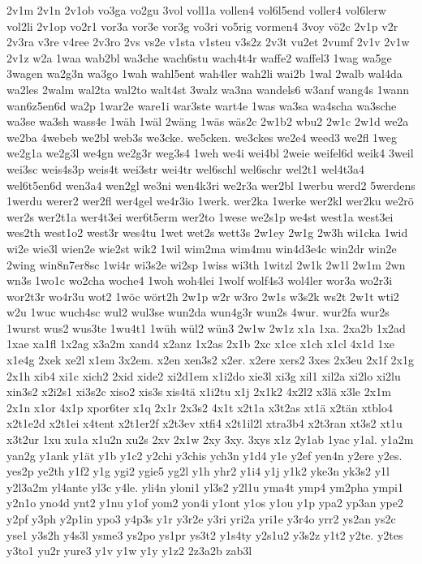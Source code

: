 {2v1m
2v1n
2v1ob
vo3ga
vo2gu
3vol
voll1a
vollen4
vol6l5end
voller4
vol6lerw
vol2li
2v1op
vo2r1
vor3a
vor3e
vor3g
vo3ri
vo5rig
vormen4
3voy
vö2c
2v1p
v2r
2v3ra
v3re
v4ree
2v3ro
2vs
vs2e
v1sta
v1steu
v3s2z
2v3t
vu2et
2vumf
2v1v
2v1w
2v1z
w2a
1waa
wab2bl
wa3che
wach6stu
wach4t4r
waffe2
waffel3
1wag
wa5ge
3wagen
wa2g3n
wa3go
1wah
wahl5ent
wah4ler
wah2li
wai2b
1wal
2walb
wal4da
wa2les
2walm
wal2ta
wal2to
walt4st
3walz
wa3na
wandels6
w3anf
wang4s
1wann
wan6z5en6d
wa2p
1war2e
ware1i
war3ste
wart4e
1was
wa3sa
wa4scha
wa3sche
wa3se
wa3sh
wass4e
1wäh
1wäl
2wäng
1wäs
wäs2c
2w1b2
wbu2
2w1c
2w1d
we2a
we2ba
4webeb
we2bl
web3s
we3cke.
we5cken.
we3ckes
we2e4
weed3
we2fl
1weg
we2g1a
we2g3l
we4gn
we2g3r
weg3s4
1weh
we4i
wei4bl
2weie
weifel6d
weik4
3weil
wei3sc
weis4s3p
weis4t
wei3str
wei4tr
wel6schl
wel6schr
wel2t1
wel4t3a4
wel6t5en6d
wen3a4
wen2gl
we3ni
wen4k3ri
we2r3a
wer2bl
1werbu
werd2
5werdens
1werdu
werer2
wer2fl
wer4gel
we4r3io
1werk.
wer2ka
1werke
wer2kl
wer2ku
we2rö
wer2s
wer2t1a
wer4t3ei
wer6t5erm
wer2to
1wese
we2s1p
we4st
west1a
west3ei
wes2th
west1o2
west3r
wes4tu
1wet
wet2s
wett3s
2w1ey
2w1g
2w3h
wi1cka
1wid
wi2e
wie3l
wien2e
wie2st
wik2
1wil
wim2ma
wim4mu
win4d3e4c
win2dr
win2e
2wing
win8n7er8sc
1wi4r
wi3s2e
wi2sp
1wiss
wi3th
1witzl
2w1k
2w1l
2w1m
2wn
wn3s
1wo1c
wo2cha
woche4
1woh
woh4lei
1wolf
wolf4s3
wol4ler
wor3a
wo2r3i
wor2t3r
wo4r3u
wot2
1wöc
wört2h
2w1p
w2r
w3ro
2w1s
w3s2k
ws2t
2w1t
wti2
w2u
1wuc
wuch4sc
wul2
wul3se
wun2da
wun4g3r
wun2s
4wur.
wur2fa
wur2s
1wurst
wus2
wus3te
1wu4t1
1wüh
wül2
wün3
2w1w
2w1z
x1a
1xa.
2xa2b
1x2ad
1xae
xa1fl
1x2ag
x3a2m
xand4
x2anz
1x2as
2x1b
2xc
x1ce
x1ch
x1cl
4x1d
1xe
x1e4g
2xek
xe2l
x1em
3x2em.
x2en
xen3s2
x2er.
x2ere
xers2
3xes
2x3eu
2x1f
2x1g
2x1h
xib4
xi1c
xich2
2xid
xide2
xi2d1em
x1i2do
xie3l
xi3g
xil1
xil2a
xi2lo
xi2lu
xin3s2
x2i2s1
xi3s2c
xiso2
xis3s
xis4tä
x1i2tu
x1j
2x1k2
4x2l2
x3lä
x3le
2x1m
2x1n
x1or
4x1p
xpor6ter
x1q
2x1r
2x3s2
4x1t
x2t1a
x3t2as
xt1ä
x2tän
xtblo4
x2t1e2d
x2t1ei
x4tent
x2t1er2f
x2t3ev
xtfi4
x2t1il2l
xtra3b4
x2t3ran
xt3s2
xt1u
x3t2ur
1xu
xu1a
x1u2n
xu2s
2xv
2x1w
2xy
3xy.
3xys
x1z
2y1ab
1yac
y1al.
y1a2m
yan2g
y1ank
y1ät
y1b
y1c2
y2chi
y3chis
ych3n
y1d4
y1e
y2ef
yen4n
y2ere
y2es.
yes2p
ye2th
y1f2
y1g
ygi2
ygie5
yg2l
y1h
yhr2
y1i4
y1j
y1k2
yke3n
yk3s2
y1l
y2l3a2m
yl4ante
yl3c
y4le.
yli4n
yloni1
yl3s2
y2l1u
yma4t
ymp4
ym2pha
ympi1
y2n1o
yno4d
ynt2
y1nu
y1of
yom2
yon4i
y1ont
y1os
y1ou
y1p
ypa2
yp3an
ype2
y2pf
y3ph
y2p1in
ypo3
y4p3s
y1r
y3r2e
y3ri
yri2a
yri1e
y3r4o
yrr2
ys2an
ys2c
yse1
y3s2h
y4s3l
ysme3
ys2po
ys1pr
ys3t2
y1s4ty
y2s1u2
y3s2z
y1t2
y2te.
y2tes
y3to1
yu2r
yure3
y1v
y1w
y1y
y1z2
2z3a2b
zab3l
}
